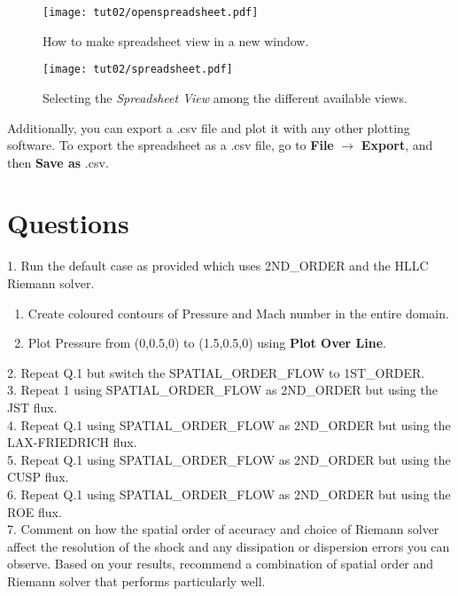 \begin{figure}[htbp]
    \centering
    \texttt{[image: tut02/openspreadsheet.pdf]}
    \caption{How to make spreadsheet view in a new window.}
    \label{fig2:open_spreadsheet}
\end{figure}
\begin{figure}[htbp]
    \centering
    \texttt{[image: tut02/spreadsheet.pdf]}
    \caption{Selecting the \textit{Spreadsheet View} among the different available views.}
    \label{fig2:spreadsheet}
\end{figure}
Additionally, you can export a .csv file and plot it with any other plotting software. To export the spreadsheet as a .csv file, go to \textbf{File} $\rightarrow$ \textbf{Export}, and then \textbf{Save as} .csv.
\clearpage
\section{Questions}
1. Run the default case as provided which uses 2ND\_ORDER and the HLLC Riemann solver.
\begin{enumerate}[label=(\alph*)]
    \item Create coloured contours of Pressure and Mach number in the entire domain.
    \item Plot Pressure from (0,0.5,0) to (1.5,0.5,0) using \textbf{Plot Over Line}.
\end{enumerate}
2. Repeat Q.1 but switch the SPATIAL\_ORDER\_FLOW to 1ST\_ORDER. \\
3. Repeat 1 using SPATIAL\_ORDER\_FLOW as 2ND\_ORDER but using the JST flux. \\
4. Repeat Q.1 using SPATIAL\_ORDER\_FLOW as 2ND\_ORDER but using the LAX-FRIEDRICH flux. \\
5. Repeat Q.1 using SPATIAL\_ORDER\_FLOW as 2ND\_ORDER but using the CUSP flux. \\
6. Repeat Q.1 using SPATIAL\_ORDER\_FLOW as 2ND\_ORDER but using the ROE flux. \\
7. Comment on how the spatial order of accuracy and choice of Riemann solver affect the resolution of the shock and any dissipation or dispersion errors you can observe. Based on your results, recommend a combination of spatial order and Riemann solver that performs particularly well.
